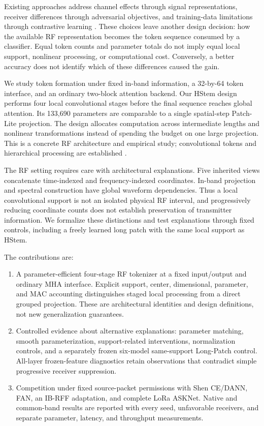 \documentclass[journal]{IEEEtran}
\begin{document}
Existing approaches address channel effects through signal representations, receiver differences through adversarial objectives, and training-data limitations through contrastive learning \cite{shen2022scalable,shen2024receiver,ma2025robust}. These choices leave another design decision: how the available RF representation becomes the token sequence consumed by a classifier. Equal token counts and parameter totals do not imply equal local support, nonlinear processing, or computational cost. Conversely, a better accuracy does not identify which of these differences caused the gain.

We study token formation under fixed in-band information, a 32-by-64 token interface, and an ordinary two-block attention backend. Our HStem design performs four local convolutional stages before the final sequence reaches global attention. Its 133,690 parameters are comparable to a single spatial-step Patch-Lite projection. The design allocates computation across intermediate lengths and nonlinear transformations instead of spending the budget on one large projection. This is a concrete RF architecture and empirical study; convolutional tokens and hierarchical processing are established \cite{wu2021cvt,wang2021pvt,liu2021swin}.

The RF setting requires care with architectural explanations. Five inherited views concatenate time-indexed and frequency-indexed coordinates. In-band projection and spectral construction have global waveform dependencies. Thus a local convolutional support is not an isolated physical RF interval, and progressively reducing coordinate counts does not establish preservation of transmitter information. We formalize these distinctions and test explanations through fixed controls, including a freely learned long patch with the same local support as HStem.

The contributions are:
\begin{enumerate}
\item A parameter-efficient four-stage RF tokenizer at a fixed input/output and ordinary MHA interface. Explicit support, center, dimensional, parameter, and MAC accounting distinguishes staged local processing from a direct grouped projection. These are architectural identities and design definitions, not new generalization guarantees.
\item Controlled evidence about alternative explanations: parameter matching, smooth parameterization, support-related interventions, normalization controls, and a separately frozen six-model same-support Long-Patch control. All-layer frozen-feature diagnostics retain observations that contradict simple progressive receiver suppression.
\item Competition under fixed source-packet permissions with Shen CE/DANN, FAN, an IB-RFF adaptation, and complete LoRa ASKNet. Native and common-band results are reported with every seed, unfavorable receivers, and separate parameter, latency, and throughput measurements.
\end{enumerate}
\end{document}
